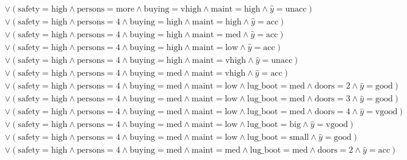\begin{scriptsize}
\[\begin{aligned}
  \\ & \lor (\text{safety}=\text{high} \land \text{persons}=\text{more} \land \text{buying}=\text{vhigh} \land \text{maint}=\text{high} \land \hat{y}=\text{unacc})
  \\ & \lor (\text{safety}=\text{high} \land \text{persons}=\text{4} \land \text{buying}=\text{high} \land \text{maint}=\text{high} \land \hat{y}=\text{acc})
  \\ & \lor (\text{safety}=\text{high} \land \text{persons}=\text{4} \land \text{buying}=\text{high} \land \text{maint}=\text{med} \land \hat{y}=\text{acc})
  \\ & \lor (\text{safety}=\text{high} \land \text{persons}=\text{4} \land \text{buying}=\text{high} \land \text{maint}=\text{low} \land \hat{y}=\text{acc})
  \\ & \lor (\text{safety}=\text{high} \land \text{persons}=\text{4} \land \text{buying}=\text{high} \land \text{maint}=\text{vhigh} \land \hat{y}=\text{unacc})
  \\ & \lor (\text{safety}=\text{high} \land \text{persons}=\text{4} \land \text{buying}=\text{med} \land \text{maint}=\text{vhigh} \land \hat{y}=\text{acc})
  \\ & \lor (\text{safety}=\text{high} \land \text{persons}=\text{4} \land \text{buying}=\text{med} \land \text{maint}=\text{low} \land \text{lug_boot}=\text{med} \land \text{doors}=\text{2} \land \hat{y}=\text{good})
  \\ & \lor (\text{safety}=\text{high} \land \text{persons}=\text{4} \land \text{buying}=\text{med} \land \text{maint}=\text{low} \land \text{lug_boot}=\text{med} \land \text{doors}=\text{3} \land \hat{y}=\text{good})
  \\ & \lor (\text{safety}=\text{high} \land \text{persons}=\text{4} \land \text{buying}=\text{med} \land \text{maint}=\text{low} \land \text{lug_boot}=\text{med} \land \text{doors}=\text{4} \land \hat{y}=\text{vgood})
  \\ & \lor (\text{safety}=\text{high} \land \text{persons}=\text{4} \land \text{buying}=\text{med} \land \text{maint}=\text{low} \land \text{lug_boot}=\text{big} \land \hat{y}=\text{vgood})
  \\ & \lor (\text{safety}=\text{high} \land \text{persons}=\text{4} \land \text{buying}=\text{med} \land \text{maint}=\text{low} \land \text{lug_boot}=\text{small} \land \hat{y}=\text{good})
  \\ & \lor (\text{safety}=\text{high} \land \text{persons}=\text{4} \land \text{buying}=\text{med} \land \text{maint}=\text{med} \land \text{lug_boot}=\text{med} \land \text{doors}=\text{2} \land \hat{y}=\text{acc})

\end{aligned}\]
\end{scriptsize}
